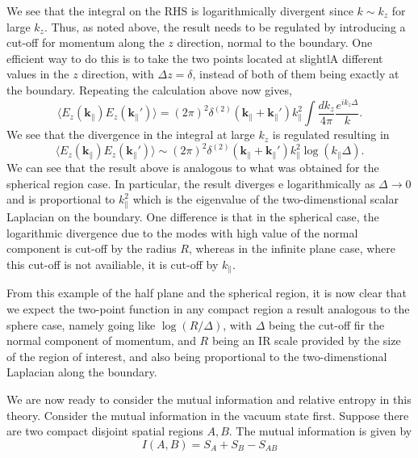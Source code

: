 We see that the integral on the RHS is logarithmically divergent since $k\sim
k_z$ for large $k_z$. Thus, as noted above, the result needs to be regulated by
introducing a cut-off for momentum along the $z$ direction, normal to the
boundary. One efficient way to do this is to take the two points located at
slightlA different values in the $z$ direction, with $\Delta z = \delta$,
instead of both of them being exactly at the boundary. Repeating the 
calculation above now gives,
\begin{equation}
  \langle E_z(\mathbf{k}_{\|})E_z(\mathbf{k}_{\|}')\rangle
  = (2\pi)^2\delta^{(2)}(\mathbf{k}_{\|}
  + \mathbf{k}_{\|}')k^2_{\|}\int{\frac{dk_z}{4\pi}\frac{e^{ik_z\Delta}}{k}}.
  \label{eq:twopointelectric}
\end{equation}
We see that the divergence in the integral at large $k_z$ is regulated
resulting in
\begin{equation}
  \langle E_z(\mathbf{k}_{\|})E_z(\mathbf{k}_{\|}')\rangle
  \sim (2\pi)^2\delta^{(2)}(\mathbf{k}_{\|}
  + \mathbf{k}_{\|}')k^2_{\|}\log(k_{\|}\Delta).
  \label{eq:twopointdivergence}
\end{equation}
We can see that the result above is analogous to what was obtained for the
spherical region case. In particular, the result diverges e logarithmically as 
$\Delta\rightarrow 0$ and is proportional to $k^2_{\|}$ which is the eigenvalue
of the two-dimenstional scalar Laplacian on the boundary. One difference is
that in the spherical case, the logarithmic divergence due to the modes
with high value of the normal component is cut-off by the radius $R$, whereas
in the infinite plane case, where this cut-off is not availiable, it is
cut-off by $k_{\|}$.
\par From this example of the half plane and the spherical region, it is now
clear that we expect the two-point function in any compact region a result
analogous to the sphere case, namely going like $\log(R/\Delta)$, with $\Delta$
being the cut-off fir the normal component of momentum, and $R$ being an IR
scale provided by the size of the region of interest, and also being
proportional to the two-dimenstional Laplacian along the boundary.
\par We are now ready to consider the mutual information and relative entropy
in this theory. Consider the mutual information in the vacuum state first.
Suppose there are two compact disjoint spatial regions $A,B$. The mutual
information is given by 
\begin{equation}
  I(A,B) = S_A + S_B - S_{AB}
\end{equation}
